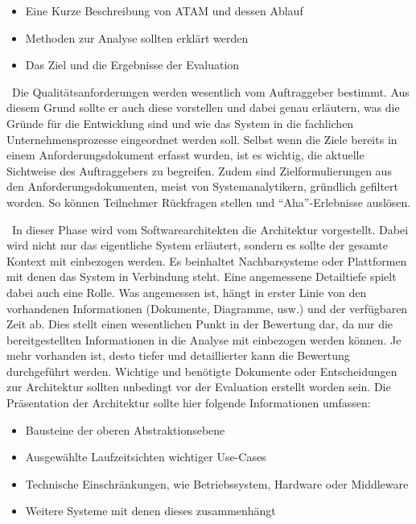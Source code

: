 \begin{itemize}[]
	\item Eine Kurze Beschreibung von ATAM und dessen Ablauf
	\item Methoden zur Analyse sollten erklärt werden
	\item Das Ziel und die Ergebnisse der Evaluation
\end{itemize}

\
Die Qualitätsanforderungen werden wesentlich vom Auftraggeber bestimmt. Aus diesem Grund sollte er auch diese vorstellen und dabei genau erläutern, was die Gründe für die Entwicklung sind und wie das System in die fachlichen Unternehmensprozesse eingeordnet werden soll. Selbst wenn die Ziele bereits in einem Anforderungsdokument erfasst wurden, ist es wichtig, die aktuelle Sichtweise des Auftraggebers zu begreifen. Zudem sind Zielformulierungen aus den Anforderungsdokumenten, meist von Systemanalytikern, gründlich gefiltert worden\cite{Starke2015}. So können Teilnehmer Rückfragen stellen und \enquote{Aha}-Erlebnisse auslösen.

\
In dieser Phase wird vom Softwarearchitekten die Architektur vorgestellt. Dabei wird nicht nur das eigentliche System erläutert, sondern es sollte der gesamte Kontext mit einbezogen werden\cite{Starke2015}. Es beinhaltet Nachbarsysteme oder Plattformen mit denen das System in Verbindung steht. Eine angemessene Detailtiefe spielt dabei auch eine Rolle. Was angemessen ist, hängt in erster Linie von den vorhandenen Informationen (Dokumente, Diagramme, usw.) und der verfügbaren Zeit ab. Dies stellt einen wesentlichen Punkt in der Bewertung dar\cite{Clements2000}, da nur die bereitgestellten Informationen in die Analyse mit einbezogen werden können. Je mehr vorhanden ist, desto tiefer und detaillierter kann die Bewertung durchgeführt werden. Wichtige und benötigte Dokumente oder Entscheidungen zur Architektur sollten unbedingt vor der Evaluation erstellt worden sein.
Die Präsentation der Architektur sollte hier folgende Informationen umfassen\cites{Clements2000}{Starke2015}:

\begin{itemize}[]
	\item Bausteine der oberen Abstraktionsebene
	\item Ausgewählte Laufzeitsichten wichtiger Use-Cases
	\item Technische Einschränkungen, wie Betriebssystem, Hardware oder Middleware
	\item Weitere Systeme mit denen dieses zusammenhängt 
\end{itemize}
